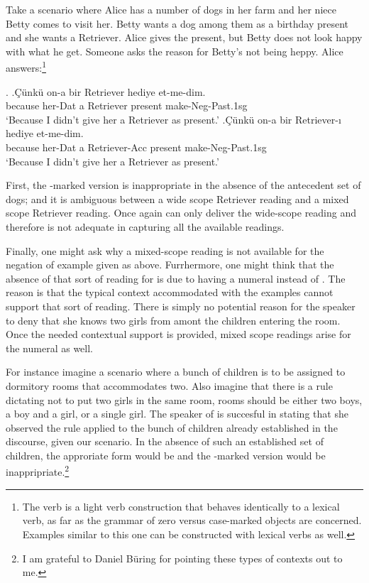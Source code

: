 \documentclass[11pt,a4paper]{article}
\begin{document}
Take a scenario where Alice has a number of dogs in her farm and her niece Betty comes to visit her. Betty wants a dog among them as a birthday present and she wants a Retriever. Alice gives the present, but Betty does not look happy with what he get. Someone asks the reason for Betty's not being heppy. Alice answers:\footnote{The verb  is a light verb construction that behaves identically to a lexical verb, as far as the grammar of zero versus case-marked objects are concerned. Examples similar to this one can be constructed with lexical verbs as well.}

\ex.
\ag.\label{retz}Çünkü on-a bir Retriever hediye et-me-dim.\\
 because her-Dat a Retriever present make-Neg-Past.1sg\\
`Because I didn't give her a Retriever as present.'
\bg.\label{reta}Çünkü on-a bir Retriever-ı hediye et-me-dim.\\ 
because her-Dat a Retriever-Acc present make-Neg-Past.1sg\\
`Because I didn't give her a Retriever as present.'


First, the \acc-marked version  is inappropriate in the absence of the antecedent set of dogs; and it is ambiguous between a wide scope Retriever reading and a mixed scope Retriever reading. Once again  can only deliver the wide-scope reading and therefore is not adequate in capturing all the available readings.  

Finally, one might ask why a mixed-scope reading is not available for the negation of  example given as  above. Furrhermore, one might think that the absence of that sort of reading for  is due to having a numeral  instead of . The reason is that the typical context accommodated with the examples cannot support that sort of reading. There is simply no potential reason for the speaker to deny that she knows two girls from amont the children entering the room. Once the needed contextual support is provided, mixed scope readings arise for the numeral  as well.

For instance imagine a scenario where a bunch of children is to be assigned to dormitory rooms that accommodates two. Also imagine that there is a rule dictating not to put two girls in the same room, rooms should be either two boys, a boy and a girl, or a single girl. The speaker of  is succesful in stating that she observed the rule applied to the bunch of children already established in the discourse, given our scenario. In the absence of such an established set of children, the approriate form would be  and the \acc-marked version  would be inappripriate.\footnote{I am grateful to Daniel Büring for pointing these types of contexts out to me.} 
\end{document}
